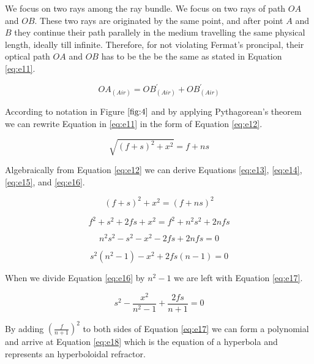 \documentclass[main.tex]{subfiles}
\begin{document}
We focus on two rays among the ray bundle. We focus on two rays of path $OA$ and $OB$. These two rays are originated by the same point, and after point $A$ and $B$ they continue their path parallely in the medium travelling the same physical length, ideally till infinite. Therefore, for not violating Fermat's proncipal, their optical path $OA$ and $OB$ has to be the be the same as stated in Equation \ref{eq:e11}.

\begin{equation}\label{eq:e11}
OA_{(Air)} = OB^{\prime}_{(Air)} + OB^{\prime}_{(Air)}
\end{equation}

According to notation in Figure $\ref{fig:4}$ and by applying Pythagorean's theorem we can rewrite Equation in \ref{eq:e11} in the form of Equation \ref{eq:e12}.

\begin{equation}\label{eq:e12}
\sqrt{(f+s)^2 + x^2} = f + ns
\end{equation}

Algebraically from Equation \ref{eq:e12} we can derive Equations \ref{eq:e13}, \ref{eq:e14}, \ref{eq:e15}, and \ref{eq:e16}. 

\begin{equation}\label{eq:e13}
(f+s)^2 + x^2 = (f + ns)^2
\end{equation}

\begin{equation}\label{eq:e14}
f^2 + s^2 + 2fs + x^2 = f^2 + n^2s^2 + 2nfs
\end{equation}

\begin{equation}\label{eq:e15}
n^2s^2 - s^2 - x^2 - 2fs + 2nfs = 0
\end{equation}

\begin{equation}\label{eq:e16}
s^2(n^2 - 1) - x^2 + 2fs(n-1) = 0
\end{equation}

When we divide  Equation \ref{eq:e16} by $n^2-1$ we are left with Equation \ref{eq:e17}.

\begin{equation}\label{eq:e17}
s^2 - \frac{x^2}{n^2-1} + \frac{2fs}{n+1} = 0
\end{equation}

By adding $(\frac{f}{n+1})^2$ to both sides of Equation \ref{eq:e17} we can form a polynomial and arrive at Equation \ref{eq:e18} which is the equation of a hyperbola and represents an hyperboloidal refractor. 
\end{document}
